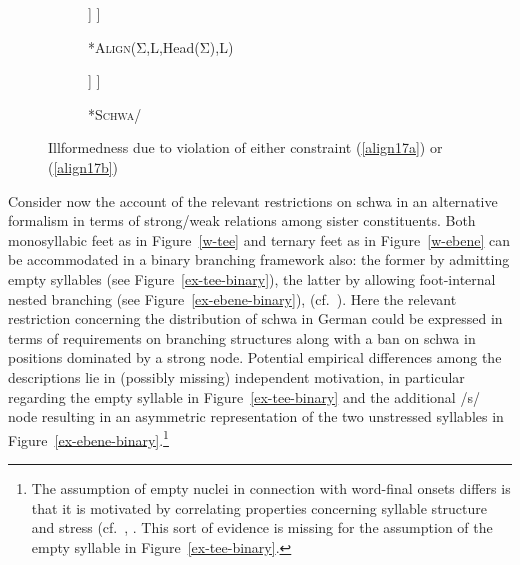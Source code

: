 \documentclass[output=paper
 ,nobabel
 ,draftmode
 ,colorlinks, citecolor=brown
]{langscibook}
\begin{document}
\begin{figure}
\begin{subfigure}{.49\textwidth}
\centering
\begin{forest}%
[*ω
	[Σ\sub{Hd}
		[$\sigma$\\
		$\Delta$\\
		{(tə)}
		]
	]
]
\end{forest}
\caption{*\textsc{Align}(Σ,L,Head(Σ),L)}\label{ex-tee-align}
\end{subfigure}
%
\begin{subfigure}{.49\textwidth}
\centering
\begin{forest}%
[*ω
	[Σ\sub{Hd}
		[$\sigma$\sub{Hd}\\
		$\Delta$\\
		{(tə)}
		]
	]
]
\end{forest}
\caption{*\textsc{Schwa}/}\label{ex-tee-schwa}
\end{subfigure}
\caption{Illformedness due to violation of either constraint (\ref{align17a}) or (\ref{align17b})}
\end{figure}

Consider now the account of the relevant restrictions on schwa in an alternative formalism in terms
of strong/weak relations among sister constituents. Both monosyllabic feet as in Figure~\ref{w-tee}
and ternary feet as in Figure~\ref{w-ebene} can be accommodated in a binary branching framework
also: the former by admitting empty syllables (see Figure~\ref{ex-tee-binary}), the latter by
allowing foot-internal nested branching (see Figure~\ref{ex-ebene-binary}), (cf.\
\citealp[57]{Giegerich1985}). Here the relevant restriction concerning the distribution of schwa in
German could be expressed in terms of requirements on branching structures along with a ban on schwa
in positions dominated by a strong node. Potential empirical differences among the descriptions lie
in (possibly missing) independent motivation, in particular regarding the empty syllable in  Figure~\ref{ex-tee-binary} and the additional /s/ node resulting in an asymmetric representation of the two unstressed syllables in Figure~\ref{ex-ebene-binary}.\footnote{The assumption of empty nuclei in connection with word-final onsets differs is that it is motivated by correlating properties concerning syllable structure and stress (cf.\ \citealp{HarrisGussman2002}, \citet[88--90]{Raffelsiefen2021}. This sort of evidence is missing for the assumption of the empty syllable in Figure~\ref{ex-tee-binary}.}  
\end{document}
